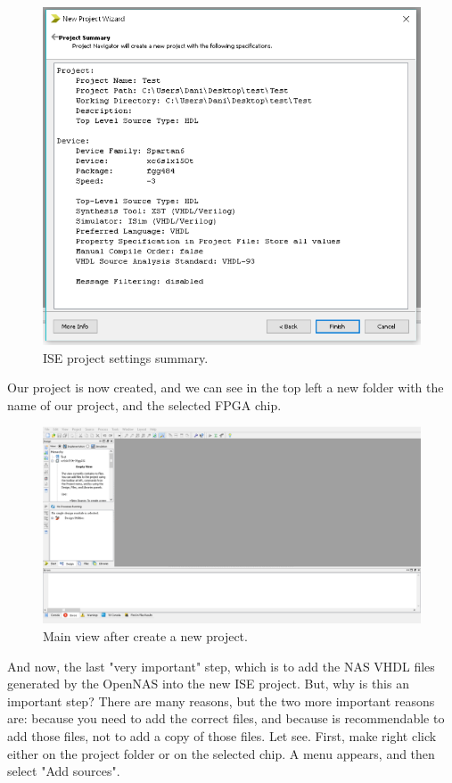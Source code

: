 \begin{figure}[H]
\centering
\includegraphics[width=1\textwidth]{images/Img32_NewProject_Summary.PNG}
\caption{\label{fig:ISE_project_summary}ISE project settings summary.}
\end{figure}

Our project is now created, and we can see in the top left a new folder with the name of our project, and the selected FPGA chip.

\begin{figure}[H]
\centering
\includegraphics[width=1\textwidth]{images/Img33_NewProject.PNG}
\caption{\label{fig:ISE_project_created}Main view after create a new project.}
\end{figure}

And now, the last "very important" step, which is to add the NAS VHDL files generated by the OpenNAS into the new ISE project. But, why is this an important step? There are many reasons, but the two more important reasons are: because you need to add the correct files, and because is recommendable to add those files, not to add a copy of those files. Let see. First, make right click either on the project folder or on the selected chip. A menu appears, and then select "Add sources".

